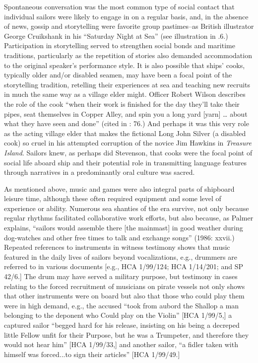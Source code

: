 Spontaneous conversation was the most common type of social contact that individual sailors were likely to engage in on a regular basis, and, in the absence of news, gossip and storytelling were favorite group pastimes--as British illustrator George Cruikshank in his “Saturday Night at Sea” (see illustration in .6.) Participation in storytelling served to strengthen social bonds and maritime traditions, particularly as the repetition of stories also demanded accommodation to the original speaker’s performance style. It is also possible that ships’ cooks, typically older and/or disabled seamen, may have been a focal point of the storytelling tradition, retelling their experiences at sea and teaching new recruits in much the same way as a village elder might. Officer Robert Wilson describes the role of the cook “when their work is finished for the day they’ll take their pipes, seat themselves in Copper Alley, and spin you a long yard [yarn] … about what they have seen and done” (cited in \citealt{AdkinsAdkins2008}: 76.) And perhaps it was this very role as the acting village elder that makes the fictional Long John Silver (a disabled cook) so cruel in his attempted corruption of the novice Jim Hawkins in  \textit{Treasure Island}. Sailors knew, as perhaps did Stevenson, that cooks were the focal point of social life aboard ship and their potential role in transmitting language features through narratives in a predominantly oral culture was sacred. 

As mentioned above, music and games were also integral parts of shipboard leisure time, although these often required equipment and some level of experience or ability. Numerous sea shanties of the era survive, not only because regular rhythms facilitated collaborative work efforts, but also because, as Palmer explains, “sailors would assemble there [the mainmast] in good weather during dog-watches and other free times to talk and exchange songs” (1986: xxvii.) Repeated references to instruments in witness testimony shows that music featured in the daily lives of sailors beyond vocalizations, e.g., drummers are referred to in various documents [e.g., HCA 1/99/124; HCA 1/14/201; and SP 42/6.] The drum may have served a military purpose, but testimony in cases relating to the forced recruitment of musicians on pirate vessels not only  shows that other instruments were on board but also that those who could play them were in high demand, e.g., the accused “took from aubord the Shallop a man belonging to the deponent who Could play on the Violin” [HCA 1/99/5,] a captured sailor “begged hard for his release, insisting on his being a decreped little Fellow unfit for their Purpose, but he was a Trumpeter, and therefore they would not hear him” [HCA 1/99/33,] and another sailor, “a fidler taken with himself was forced...to sign their articles” [HCA 1/99/49.] 

